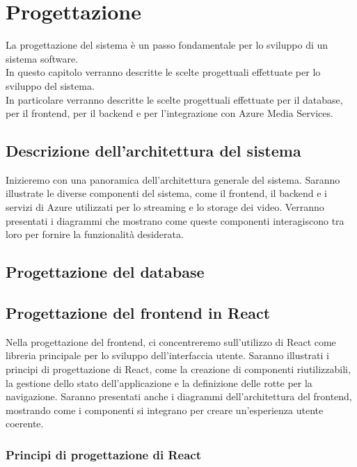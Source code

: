 \chapter{Progettazione}
\label{cap:progettazione}

La progettazione del sistema è un passo fondamentale per lo sviluppo di un sistema software.\\
In questo capitolo verranno descritte le scelte progettuali effettuate per lo sviluppo del sistema.\\
In particolare verranno descritte le scelte progettuali effettuate per il database, per il frontend, per il backend e per l'integrazione con Azure Media Services.\\

\section{Descrizione dell'architettura del sistema}

Inizieremo con una panoramica dell'architettura generale del sistema. Saranno illustrate le diverse componenti del sistema, 
come il frontend, il backend e i servizi di Azure utilizzati per lo streaming e lo storage dei video. 
Verranno presentati i diagrammi che mostrano come queste componenti interagiscono tra loro per fornire la funzionalità desiderata.

\section{Progettazione del database}

\section{Progettazione del frontend in React}

Nella progettazione del frontend, ci concentreremo sull'utilizzo di React come libreria principale per lo sviluppo dell'interfaccia utente. Saranno illustrati i principi di progettazione di React, come la creazione di componenti riutilizzabili, la gestione dello stato dell'applicazione e la definizione delle rotte per la navigazione. Saranno presentati anche i diagrammi dell'architettura del frontend, mostrando come i componenti si integrano per creare un'esperienza utente coerente.

\subsection{Principi di progettazione di React}


